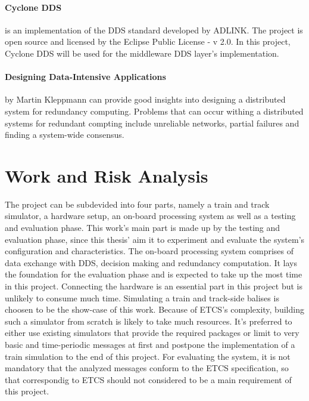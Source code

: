 \documentclass[a4paper, 12pt]{scrartcl}
\begin{document}
\paragraph{Cyclone DDS} is an implementation of the \ac{DDS} standard developed by ADLINK.
The project is open source and licensed by the Eclipse Public License - v 2.0.
In this project, Cyclone DDS will be used for the middleware \ac{DDS} layer's implementation.
\vspace{-0.4cm}
\paragraph{Designing Data-Intensive Applications} by Martin Kleppmann can provide good insights into designing a distributed system for redundancy computing.
Problems that can occur withing a distributed systems for redundant compting include unreliable networks, partial failures and finding a system-wide consensus.

\section*{Work and Risk Analysis}

The project can be subdevided into four parts, namely a train and track simulator, a hardware setup, an on-board processing system as well as a testing and evaluation phase.
This work's main part is made up by the testing and evaluation phase, since this thesis' aim it to experiment and evaluate the system's configuration and characteristics.
The on-board processing system comprises of data exchange with \ac{DDS}, decision making and redundancy computation.
It lays the foundation for the evaluation phase and is expected to take up the most time in this project.
Connecting the hardware is an essential part in this project but is unlikely to consume much time.
Simulating a train and track-side balises is choosen to be the show-case of this work.
Because of \ac{ETCS}'s complexity, building such a simulator from scratch is likely to take much resources.
It's preferred to either use existing simulators that provide the required packages or limit to very basic and time-periodic messages at first and postpone the implementation of a train simulation to the end of this project.
For evaluating the system, it is not mandatory that the analyzed messages conform to the \ac{ETCS} specification, so that correspondig to \ac{ETCS} should not considered to be a main requirement of this project.
\end{document}
